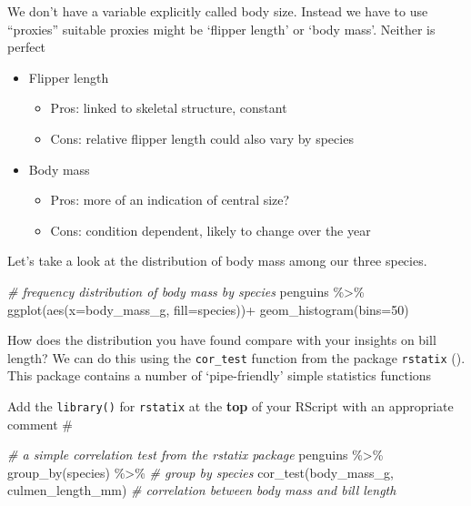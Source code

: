 \documentclass[
]{book}
\newenvironment{Shaded}{\begin{snugshade}}{\end{snugshade}}
\newcommand{\AttributeTok}[1]{\textcolor[rgb]{0.77,0.63,0.00}{#1}}
\newcommand{\CommentTok}[1]{\textcolor[rgb]{0.56,0.35,0.01}{\textit{#1}}}
\newcommand{\DecValTok}[1]{\textcolor[rgb]{0.00,0.00,0.81}{#1}}
\newcommand{\FunctionTok}[1]{\textcolor[rgb]{0.00,0.00,0.00}{#1}}
\newcommand{\NormalTok}[1]{#1}
\newcommand{\SpecialCharTok}[1]{\textcolor[rgb]{0.00,0.00,0.00}{#1}}
\providecommand{\tightlist}{%
  \setlength{\itemsep}{0pt}\setlength{\parskip}{0pt}}
\begin{document}
We don't have a variable explicitly called body size. Instead we have to use ``proxies'' suitable proxies might be `flipper length' or `body mass'. Neither is perfect

\begin{itemize}
\tightlist
\item
  Flipper length

  \begin{itemize}
  \tightlist
  \item
    Pros: linked to skeletal structure, constant
  \item
    Cons: relative flipper length could also vary by species
  \end{itemize}
\item
  Body mass

  \begin{itemize}
  \tightlist
  \item
    Pros: more of an indication of central size?
  \item
    Cons: condition dependent, likely to change over the year
  \end{itemize}
\end{itemize}

Let's take a look at the distribution of body mass among our three species.

\begin{Shaded}
\begin{Highlighting}[]
\CommentTok{\# frequency distribution of body mass by species}
\NormalTok{penguins }\SpecialCharTok{\%\textgreater{}\%} 
  \FunctionTok{ggplot}\NormalTok{(}\FunctionTok{aes}\NormalTok{(}\AttributeTok{x=}\NormalTok{body\_mass\_g, }\AttributeTok{fill=}\NormalTok{species))}\SpecialCharTok{+}
  \FunctionTok{geom\_histogram}\NormalTok{(}\AttributeTok{bins=}\DecValTok{50}\NormalTok{)}
\end{Highlighting}
\end{Shaded}

How does the distribution you have found compare with your insights on bill length? We can do this using the \texttt{cor\_test} function from the package \texttt{rstatix} (\citet{R-rstatix}). This package contains a number of `pipe-friendly' simple statistics functions

Add the \texttt{library()} for \texttt{rstatix} at the \textbf{top} of your RScript with an appropriate comment \#

\begin{Shaded}
\begin{Highlighting}[]
\CommentTok{\# a simple correlation test from the rstatix package}
\NormalTok{penguins }\SpecialCharTok{\%\textgreater{}\%} 
  \FunctionTok{group\_by}\NormalTok{(species) }\SpecialCharTok{\%\textgreater{}\%} \CommentTok{\# group by species}
  \FunctionTok{cor\_test}\NormalTok{(body\_mass\_g, culmen\_length\_mm) }\CommentTok{\# correlation between body mass and bill length}
\end{Highlighting}
\end{Shaded}
\end{document}
